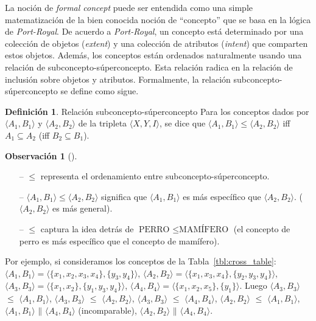 \documentclass[12pt,oneside,letterpaper]{book}
\newcommand{\eng}[1]{\textit{#1}\xspace}			%
\newcommand{\formalconcept}[2]{$\langle #1,#2 \rangle$}
\newcommand{\formalconceptext}[4]{$\langle #1,#2 \rangle = \langle\{#3\},\{#4\}\rangle$}
\newcommand{\parallelbars}{\mathbin{\|}}
\theoremstyle{definition}
\newtheorem{definition}{Definición}[section]
\newtheorem{remark}{Observación}[section]
\begin{document}
La noción de \eng{formal concept} puede ser entendida como una simple matematización de la bien conocida noción de ``concepto'' que se basa en la lógica de \eng{Port-Royal}. De acuerdo a \eng{Port-Royal}, un concepto está determinado por una colección de objetos (\eng{extent}) y una colección de atributos (\eng{intent}) que comparten estos objetos. Además, los conceptos están ordenados naturalmente usando una relación de subconcepto-súperconcepto. Esta relación radica en la relación de inclusión sobre objetos y atributos. Formalmente, la relación subconcepto-súperconcepto se define como sigue. 

\begin{definition}{Relación subconcepto-súperconcepto}
Para los conceptos dados por $\langle A_1,B_1 \rangle$ y $\langle A_2, B_2 \rangle$ de la tripleta $\langle X,Y,I \rangle$, se dice que $\langle A_1,B_1 \rangle \le \langle A_2,B_2 \rangle$ iff $A_1 \subseteq A_2$ (iff $B_2 \subseteq B_1$).
\end{definition}
\begin{remark}[]
	$ $
	\begin{itemize}
		\item[--] $\le$ representa el ordenamiento entre subconcepto-súperconcepto.
		\item[--] $\langle A_1,B_1 \rangle \le \langle A_2,B_2 \rangle$ significa que $\langle A_1,B_1 \rangle$ es más específico que $\langle A_2,B_2 \rangle$. ($\langle A_2,B_2 \rangle$ es más general).
		\item[--] $\le$ captura la idea detrás de $\text{PERRO } \le \text{MAMÍFERO}$ (el concepto de perro es más específico que el concepto de mamífero). 
	\end{itemize}
\end{remark}

Por ejemplo, si consideramos los conceptos de la Tabla~\ref{tbl:cross_table}: \\ \formalconceptext{A_1}{B_1}{x_1,x_2,x_3,x_4}{y_3,y_4}, \formalconceptext{A_2}{B_2}{x_1,x_3,x_4}{y_2,y_3,y_4}, \formalconceptext{A_3}{B_3}{x_1,x_2}{y_1,y_3,y_4}, \formalconceptext{A_4}{B_4}{x_1,x_2,x_5}{y_1}. Luego \formalconcept{A_3}{B_3} $\le$ \formalconcept{A_1}{B_1}, \formalconcept{A_3}{B_3} $\le$ \formalconcept{A_2}{B_2}, \formalconcept{A_3}{B_3} $\le$ \formalconcept{A_4}{B_4}, \formalconcept{A_2}{B_2} $\le$ \formalconcept{A_1}{B_1}, \formalconcept{A_1}{B_1} $\parallelbars$ \formalconcept{A_4}{B_4} (incomparable), \formalconcept{A_2}{B_2} $\parallelbars$ \formalconcept{A_4}{B_4}.
\end{document}

